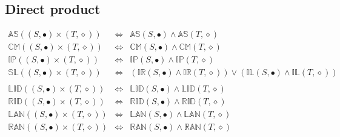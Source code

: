 \documentclass[10pt]{report}
\newcommand{\propname}[1]{{\mathbb{#1}}}
\begin{document}
\subsection{Direct product} 

\[
\begin{array}{rcl} 
\propname{AS}((S, \bullet) \times (T, \diamond)) 
   & \Leftrightarrow %
   & \propname{AS}(S, \bullet) \wedge  \propname{AS}(T, \diamond) \\ 
\propname{CM}((S, \bullet) \times (T, \diamond)) 
   & \Leftrightarrow %
   & \propname{CM}(S, \bullet) \wedge  \propname{CM}(T, \diamond) \\ 
\propname{IP}((S, \bullet) \times (T, \diamond)) 
   & \Leftrightarrow %
   & \propname{IP}(S, \bullet) \wedge  \propname{IP}(T, \diamond) \\ 
\propname{SL}((S, \bullet) \times (T, \diamond)) 
    & \Leftrightarrow %
    & (\propname{IR}(S, \bullet) \wedge  \propname{IR}(T, \diamond)) 
      \vee 
      (\propname{IL}(S, \bullet) \wedge  \propname{IL}(T, \diamond)) \\\\
      
\propname{LID}((S, \bullet) \times (T, \diamond)) 
   & \Leftrightarrow %
   & \propname{LID}(S, \bullet) \wedge  \propname{LID}(T, \diamond) \\ 
\propname{RID}((S, \bullet) \times (T, \diamond)) 
   & \Leftrightarrow %
   & \propname{RID}(S, \bullet) \wedge  \propname{RID}(T, \diamond) \\ 
\propname{LAN}((S, \bullet) \times (T, \diamond)) 
   & \Leftrightarrow %
   & \propname{LAN}(S, \bullet) \wedge  \propname{LAN}(T, \diamond) \\
\propname{RAN}((S, \bullet) \times (T, \diamond)) 
   & \Leftrightarrow %
   & \propname{RAN}(S, \bullet) \wedge  \propname{RAN}(T, \diamond) \\\\
   

\end{array}\]
\end{document}
